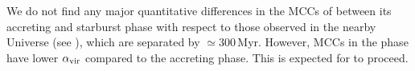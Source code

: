 \IfFileExists{emulateapjlegacy.cls}{\documentclass[iop]{emulateapjlegacy}}{\documentclass[iop]{emulateapj}}
\newcommand{\MM}[1]{({\bf \color{mmcolor} MM: #1})}
\begin{document}
We do not find any major quantitative differences in the MCCs of \flower between its accreting and starburst phase with respect to those observed in the nearby Universe (see ), which are separated by $\simeq$300\,Myr. However, MCCs in the \SB phase have lower $\alpha_{\rm vir}$ compared to the accreting phase. This is expected for \SF to proceed.


%
%
\end{document}
